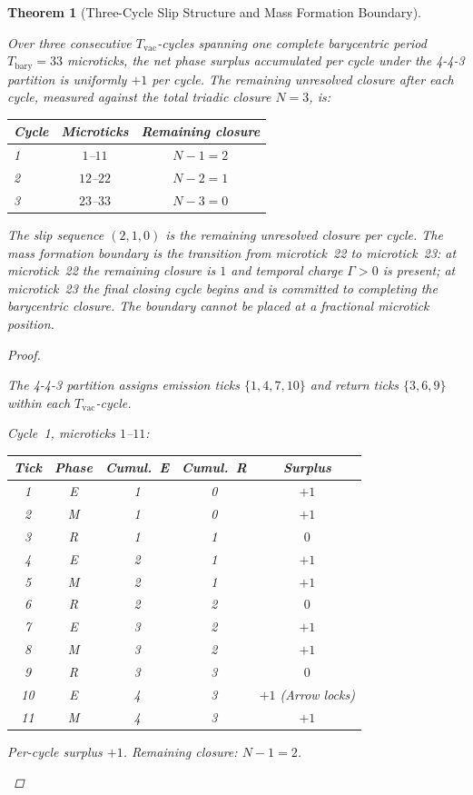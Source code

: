 \documentclass[11pt, letterpaper]{article}
\newcommand{\Tbary}{T_{\mathrm{bary}}}
\newcommand{\Tcharge}{\Gamma}
\newcommand{\Tvac}{T_{\mathrm{vac}}}
\theoremstyle{definition}
\theoremstyle{plain}
\newtheorem{theorem}{Theorem}[section]
\begin{document}
\begin{theorem}[Three-Cycle Slip Structure and Mass Formation Boundary]
\label{thm:slip-structure}
\begin{rsbox}
Over three consecutive $\Tvac$-cycles spanning one complete barycentric period
$\Tbary=33$ microticks, the net phase surplus accumulated per cycle under the
4-4-3 partition is uniformly $+1$ per cycle.  The remaining unresolved closure
after each cycle, measured against the total triadic closure $N=3$, is:

\begin{center}
\begin{tabular}{lcc}
\toprule
Cycle & Microticks & Remaining closure \\
\midrule
1 & $1$--$11$ & $N-1=2$ \\
2 & $12$--$22$ & $N-2=1$ \\
3 & $23$--$33$ & $N-3=0$ \\
\bottomrule
\end{tabular}
\end{center}

The slip sequence $(2,1,0)$ is the remaining unresolved closure per cycle.
The mass formation boundary is the transition from microtick~22 to
microtick~23: at microtick~22 the remaining closure is $1$ and temporal
charge $\Tcharge>0$ is present; at microtick~23 the final closing cycle
begins and is committed to completing the barycentric closure.  The boundary
cannot be placed at a fractional microtick position.
\end{rsbox}
\begin{proof}
\begin{rsbox}
The 4-4-3 partition assigns emission ticks $\{1,4,7,10\}$ and return ticks
$\{3,6,9\}$ within each $\Tvac$-cycle.

\textit{Cycle~1, microticks $1$--$11$:}
\begin{center}
\small
\begin{tabular}{ccccc}
\toprule
Tick & Phase & Cumul.\ E & Cumul.\ R & Surplus \\
\midrule
1&E&1&0&$+1$\\2&M&1&0&$+1$\\3&R&1&1&$0$\\
4&E&2&1&$+1$\\5&M&2&1&$+1$\\6&R&2&2&$0$\\
7&E&3&2&$+1$\\8&M&3&2&$+1$\\9&R&3&3&$0$\\
10&E&4&3&$+1$ (Arrow locks)\\11&M&4&3&$+1$\\
\bottomrule
\end{tabular}
\end{center}
Per-cycle surplus $+1$.  Remaining closure: $N-1=2$.


\end{rsbox}
\end{proof}
\end{theorem}
\end{document}
